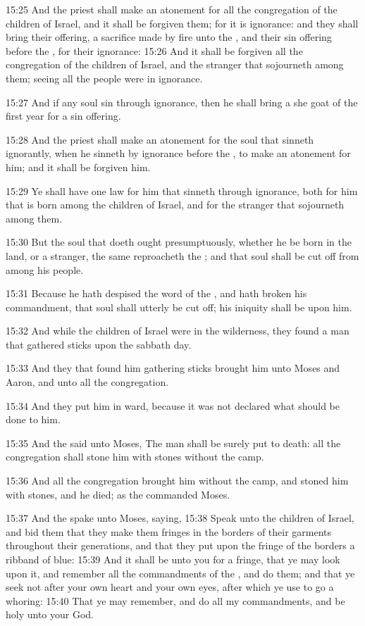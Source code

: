 15:25 And the priest shall make an atonement for all the congregation
of the children of Israel, and it shall be forgiven them; for it is
ignorance: and they shall bring their offering, a sacrifice made by
fire unto the \LORD, and their sin offering before the \LORD, for their
ignorance: 15:26 And it shall be forgiven all the congregation of the
children of Israel, and the stranger that sojourneth among them;
seeing all the people were in ignorance.

15:27 And if any soul sin through ignorance, then he shall bring a she
goat of the first year for a sin offering.

15:28 And the priest shall make an atonement for the soul that sinneth
ignorantly, when he sinneth by ignorance before the \LORD, to make an
atonement for him; and it shall be forgiven him.

15:29 Ye shall have one law for him that sinneth through ignorance,
both for him that is born among the children of Israel, and for the
stranger that sojourneth among them.

15:30 But the soul that doeth ought presumptuously, whether he be born
in the land, or a stranger, the same reproacheth the \LORD; and that
soul shall be cut off from among his people.

15:31 Because he hath despised the word of the \LORD, and hath broken
his commandment, that soul shall utterly be cut off; his iniquity
shall be upon him.

15:32 And while the children of Israel were in the wilderness, they
found a man that gathered sticks upon the sabbath day.

15:33 And they that found him gathering sticks brought him unto Moses
and Aaron, and unto all the congregation.

15:34 And they put him in ward, because it was not declared what
should be done to him.

15:35 And the \LORD said unto Moses, The man shall be surely put to
death: all the congregation shall stone him with stones without the
camp.

15:36 And all the congregation brought him without the camp, and
stoned him with stones, and he died; as the \LORD commanded Moses.

15:37 And the \LORD spake unto Moses, saying, 15:38 Speak unto the
children of Israel, and bid them that they make them fringes in the
borders of their garments throughout their generations, and that they
put upon the fringe of the borders a ribband of blue: 15:39 And it
shall be unto you for a fringe, that ye may look upon it, and remember
all the commandments of the \LORD, and do them; and that ye seek not
after your own heart and your own eyes, after which ye use to go a
whoring: 15:40 That ye may remember, and do all my commandments, and
be holy unto your God.

